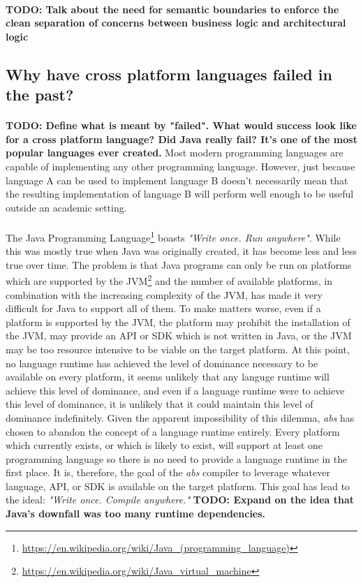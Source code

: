 \documentclass[hidelinks]{article}
\begin{document}
\paragraph{}\textbf{TODO: Talk about the need for semantic boundaries to enforce the clean separation of concerns between business logic and architectural logic}

\subsection{Why have cross platform languages failed in the past?}
\paragraph{}\textbf{TODO: Define what is meant by "failed". What would success look like for a cross platform language? Did Java really fail? It's one of the most popular languages ever created.} Most modern programming languages are capable of implementing any other programming language. However, just because language A can be used to implement language B doesn't necessarily mean that the resulting implementation of language B will perform well enough to be useful outside an academic setting.
\paragraph{}The Java Programming Language\footnote{\url{https://en.wikipedia.org/wiki/Java_(programming_language)}} boasts \textit{"Write once. Run anywhere"}. While this was mostly true when Java was originally created, it has become less and less true over time. The problem is that Java programs can only be run on platforms which are supported by the JVM\footnote{\url{https://en.wikipedia.org/wiki/Java_virtual_machine}} and the number of available platforms, in combination with the increasing complexity of the JVM, has made it very difficult for Java to support all of them. To make matters worse, even if a platform is supported by the JVM, the platform may prohibit the installation of the JVM, may provide an API or SDK which is not written in Java, or the JVM may be too resource intensive to be viable on the target platform. At this point, no language runtime has achieved the level of dominance necessary to be available on every platform, it seems unlikely that any languge runtime will achieve this level of dominance, and even if a language runtime were to achieve this level of dominance, it is unlikely that it could maintain this level of dominance indefinitely. Given the apparent impossibility of this dilemma, \textit{abs} has chosen to abandon the concept of a language runtime entirely. Every platform which currently exists, or which is likely to exist, will support at least one programming language so there is no need to provide a language runtime in the first place. It is, therefore, the goal of the \textit{abs} compiler to leverage whatever language, API, or SDK is available on the target platform. This goal has lead to the ideal: \textit{"Write once. Compile anywhere."}
\textbf{TODO: Expand on the idea that Java's downfall was too many runtime dependencies.}
\end{document}

